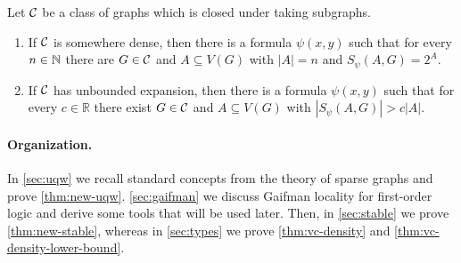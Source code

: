 \begin{theorem}\label{thm:vc-density-lower-bound}
Let $\mathcal{C}$ be a class of graphs which 
is closed under taking subgraphs. 
\begin{enumerate}[(1)]
\item If $\mathcal{C}$ is somewhere dense, then there is a formula 
$\psi(x,y)$ such that for every $n\in \mathbb{N}$ there are $G\in\mathcal{C}$ and $A\subseteq V(G)$ 
with $|A|=n$ and $S_\psi(A,G)=2^{A}$. 
\item If $\mathcal{C}$ has unbounded expansion, then there is a formula 
$\psi(x,y)$ such that for every $c\in \mathbb{R}$ there exist $G\in\mathcal{C}$ and $A\subseteq V(G)$ with $|S_\psi(A,G)|>c|A|$. 
\end{enumerate}
\end{theorem}

\paragraph{Organization.} In \cref{sec:uqw} we recall standard concepts from the theory of sparse graphs and prove \cref{thm:new-uqw}.
\cref{sec:gaifman} we discuss Gaifman locality for first-order logic and derive some tools that will be used later.
Then, in \cref{sec:stable} we prove \cref{thm:new-stable}, whereas in \cref{sec:types} we prove \cref{thm:vc-density} and \cref{thm:vc-density-lower-bound}.




%




